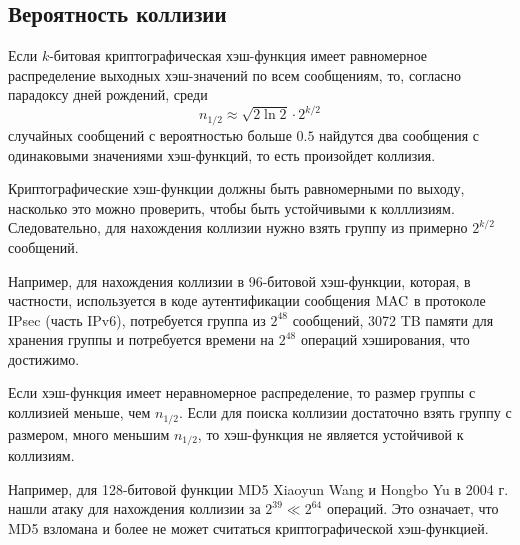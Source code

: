 \subsection{Вероятность коллизии}

Если $k$-битовая криптографическая хэш-функция имеет равномерное распределение выходных хэш-значений по всем сообщениям, то, согласно парадоксу дней рождений, среди
    \[ n_{1/2} \approx \sqrt{2 \ln 2} \cdot 2^{k/2} \]
случайных сообщений с вероятностью больше $0.5$ найдутся два сообщения с одинаковыми значениями хэш-функций, то есть произойдет коллизия.

Криптографические хэш-функции должны быть равномерными по выходу, насколько это можно проверить, чтобы быть устойчивыми к колллизиям. Следовательно, для нахождения коллизии нужно взять группу из примерно $2^{k/2}$ сообщений.

Например, для нахождения коллизии в 96-битовой хэш-функции, которая, в частности, используется в коде аутентификации сообщения $\textrm{MAC}$ в протоколе IPsec (часть IPv6), потребуется группа из $2^{48}$ сообщений, 3072 TB памяти для хранения группы и потребуется времени на $2^{48}$ операций хэширования, что достижимо.

Если хэш-функция имеет неравномерное распределение, то размер группы с коллизией меньше, чем $n_{1/2}$. Если для поиска коллизии достаточно взять группу с размером, много меньшим $n_{1/2}$, то хэш-функция не является устойчивой к коллизиям.

Например, для 128-битовой функции MD5 Xiaoyun Wang и Hongbo Yu в 2004 г. нашли атаку для нахождения коллизии за $2^{39} \ll 2^{64}$ операций. Это означает, что MD5 взломана и более не может считаться криптографической хэш-функцией.
